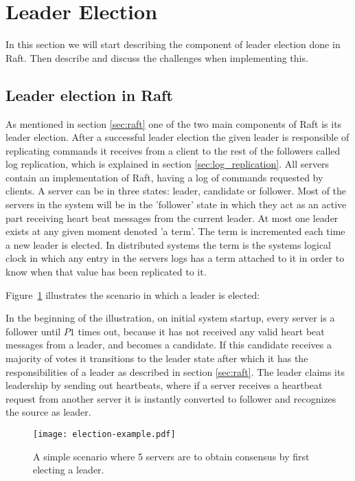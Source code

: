 \section{Leader Election} %
\label{sec:leader_election}
In this section we will start describing the component of leader election done in Raft. Then describe and discuss the challenges when implementing this.

\subsection{Leader election in Raft}
As mentioned in section \ref{sec:raft} one of the two main components of Raft is its leader election. After a successful leader election the given leader is responsible of replicating commands it receives from a client to the rest of the followers called log replication, which is explained in section \ref{sec:log_replication}. All servers contain an implementation of Raft, having a log of commands requested by clients. A server can be in three states: leader, candidate or follower. Most of the servers in the system will be in the 'follower' state in which they act as an active part receiving heart beat messages from the current leader. At most one leader exists at any given moment denoted 'a term'. The term is incremented each time a new leader is elected. In distributed systems the term is the systems logical clock in which any entry in the servers logs has a term attached to it in order to know when that value has been replicated to it.

Figure~\ref{fig:election_example} illustrates the scenario in which a leader is elected:

In the beginning of the illustration, on initial system startup, every server is a follower until $P1$ times out, because it has not received any valid heart beat messages from a leader, and becomes a candidate. If this candidate receives a majority of votes it transitions to the leader state after which it has the responsibilities of a leader as described in section \ref{sec:raft}. The leader claims its leadership by sending out heartbeats, where if a server receives a heartbeat request from another server it is instantly converted to follower and recognizes the source as leader.

\begin{figure}[ht!]
\centering
\texttt{[image: election-example.pdf]}
\caption{A simple scenario where 5 servers are to obtain consensus by first electing a leader.}
\label{fig:election_example}
\end{figure}

